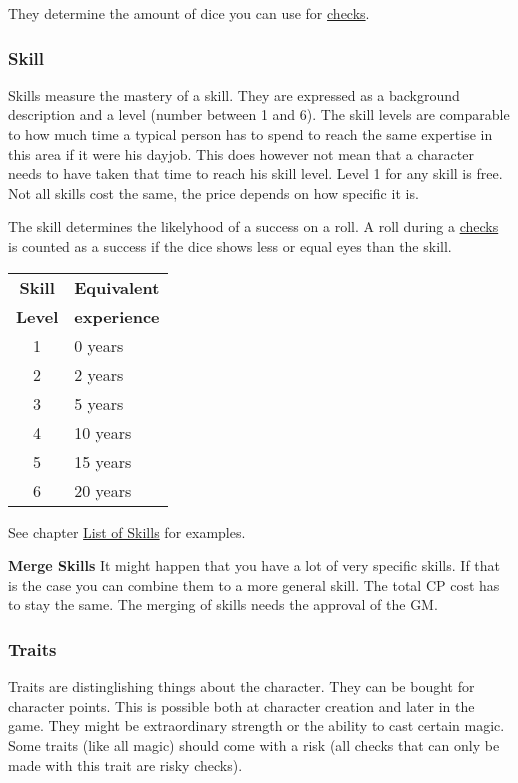 \documentclass[11pt]{article}
\begin{document}
{\begin{multicols}{2}[]
They determine the amount of dice you can use for \hyperref[sec:orga4d7be5]{checks}. 

\subsubsection{Skill}
\label{sec:org9026f1b}

Skills measure the mastery of a skill. They are expressed as a background description and a level (number between 1 and 6). The skill levels are comparable to how much time a typical person has to spend to reach the same expertise in this area if it were his dayjob. This does however not mean that a character needs to have taken that time to reach his skill level. Level 1 for any skill is free. Not all skills cost the same, the price depends on how specific it is.

The skill determines the likelyhood of a success on a roll. A roll during a \hyperref[sec:orga4d7be5]{checks} is counted as a success if the dice shows less or equal eyes than the skill.


\begin{center}
\begin{tabular}{c|l}
\textbf{Skill} & \textbf{Equivalent}\\
\textbf{Level} & \textbf{experience}\\
\hline
1 & 0 years\\
2 & 2 years\\
3 & 5 years\\
4 & 10 years\\
5 & 15 years\\
6 & 20 years\\
\end{tabular}
\end{center}

See chapter \hyperref[sec:org958d06e]{List of Skills} for examples.

\textbf{Merge Skills}
It might happen that you have a lot of very specific skills. If that is the case you can combine them to a more general skill. The total CP cost has to stay the same. The merging of skills needs the approval of the GM.

\subsubsection{Traits}
\label{sec:org7cf8b41}
Traits are distinglishing things about the character. They can be bought for character points. This is possible both at character creation and later in the game.
They might be extraordinary strength or the ability to cast certain magic. Some traits (like all magic) should come with a risk (all checks that can only be made with this trait are risky checks).


\end{multicols}}
\end{document}
